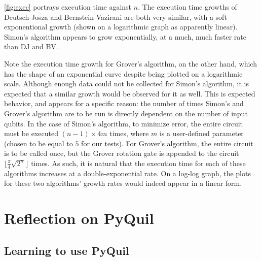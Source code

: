 \documentclass[12pt]{article}
\begin{document}
\autoref{fig:exec} portrays execution time against $n$.
The execution time growths of Deutsch-Josza and Bernstein-Vazirani are both very similar, with a soft exponentional growth (shown on a logarithmic graph as apparently linear).
Simon's algorithm appears to grow exponentially, at a much, much faster rate than DJ and BV.

Note the execution time growth for Grover's algorithm, on the other hand, which has the shape of an exponential curve despite being plotted on a logarithmic scale.
Although enough data could not be collected for Simon's algorithm, it is expected that a similar growth would be observed for it as well.
This is expected behavior, and appears for a specific reason: the number of times Simon's and Grover's algorithm are to be run is directly dependent on the number of input qubits.
In the case of Simon's algorithm, to minimize error, the entire circuit must be executed $(n-1)\times4m$ times, where $m$ is a user-defined parameter (chosen to be equal to $5$ for our tests).
For Grover's algorithm, the entire circuit is to be called once, but the Grover rotation gate is appended to the circuit $\lfloor\frac{\pi}{4}\sqrt{2^n}\rfloor$ times.
As such, it is natural that the execution time for each of these algorithms increases at a double-exponential rate.
On a log-log graph, the plots for these two algorithms' growth rates would indeed appear in a linear form.

\section{Reflection on PyQuil}

\subsection{Learning to use PyQuil}
\end{document}
